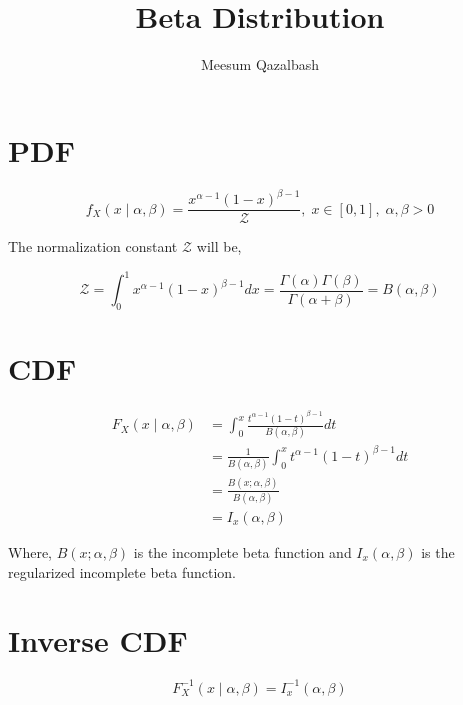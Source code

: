 \documentclass{article}
\title{Beta Distribution}
\author{Meesum Qazalbash}
\newcommand{\Z}{\mathcal{Z}}
\begin{document}
\maketitle

\section{PDF}

\begin{equation}
    f_{X}(x\mid\alpha,\beta) = \frac{x^{\alpha-1}(1-x)^{\beta-1}}{\Z},\;x\in[0,1],\;\alpha,\beta>0
\end{equation}

The normalization constant $\Z$ will be,

\begin{equation}
    \Z = \int_0^1 x^{\alpha-1}(1-x)^{\beta-1} dx = \frac{\Gamma(\alpha)\Gamma(\beta)}{\Gamma(\alpha+\beta)}=B(\alpha,\beta)
\end{equation}

\section{CDF}

\begin{align}
    F_{X}(x\mid\alpha,\beta) & = \int_0^x \frac{t^{\alpha-1}(1-t)^{\beta-1}}{B(\alpha,\beta)} dt  \\
                             & = \frac{1}{B(\alpha,\beta)}\int_0^x t^{\alpha-1}(1-t)^{\beta-1} dt \\
                             & = \frac{B(x;\alpha,\beta)}{B(\alpha,\beta)}                        \\
                             & = I_{x}(\alpha,\beta)
\end{align}

Where, $B(x;\alpha,\beta)$ is the incomplete beta function and $I_{x}(\alpha,\beta)$ is the regularized incomplete beta function.

\section{Inverse CDF}

\begin{equation}
    F_{X}^{-1}(x\mid\alpha,\beta) = I^{-1}_{x}(\alpha,\beta)
\end{equation}
\end{document}
